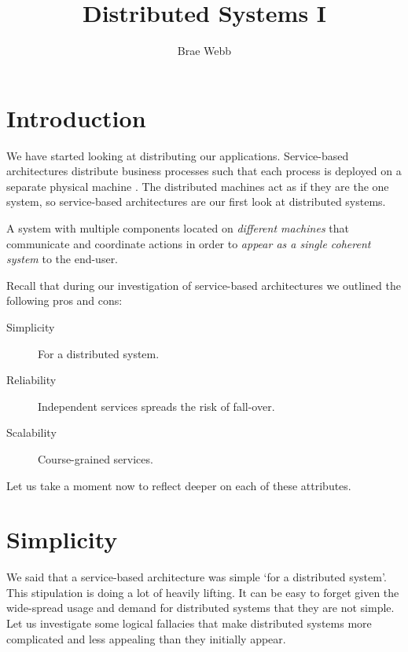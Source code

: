 \title{Distributed Systems I}
\author{Brae Webb}
\date{}

\maketitle

\section{Introduction}
We have started looking at distributing our applications.
Service-based architectures distribute business processes such that each process is deployed on a separate physical machine \cite{service-based-notes}.
The distributed machines act as if they are the one system,
so service-based architectures are our first look at distributed systems.

\begin{definition}
A system with multiple components located on \textsl{different machines} that communicate and coordinate actions in order to \textsl{appear as a single coherent system} to the end-user.
\end{definition}

\noindent Recall that during our investigation of service-based architectures we outlined the following pros and cons:
\begin{description}
    \item[Simplicity] For a distributed system.
    \item[Reliability] Independent services spreads the risk of fall-over.
    \item[Scalability] Course-grained services.
\end{description}

\noindent Let us take a moment now to reflect deeper on each of these attributes.

\section{Simplicity}
We said that a service-based architecture was simple `for a distributed system'.
This stipulation is doing a lot of heavily lifting.
It can be easy to forget given the wide-spread usage and demand for distributed systems that they are not simple.
%
Let us investigate some logical fallacies that make distributed systems more complicated and less appealing than they initially appear.

